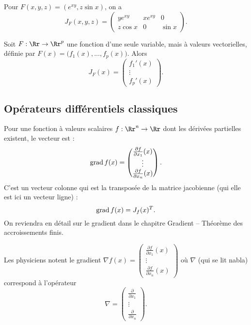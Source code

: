 \documentclass[11pt, class=report,crop=false]{standalone}
\begin{document}
\begin{exemple}
Pour $F(x,y,z)=(e^{xy},z\sin x)$, on a
$$J _F(x,y,z)=\begin{pmatrix}
y e^{xy}&x e^{xy}&0 \\ z\cos x &0&\sin x 
\end{pmatrix}.$$
\end{exemple}

\begin{exemple}
Soit $F : \Rr \to \Rr^p$ une fonction d'une seule variable, mais à valeurs vectorielles, définie par 
$F(x) = \big( f_1(x), \ldots,f_p(x) \big)$.
Alors 
$$J_F(x) =\begin{pmatrix}
f_1'(x) \\ \vdots \\ f_p'(x) 
\end{pmatrix}.$$ 
\end{exemple}


\subsection{Opérateurs différentiels classiques}
 

Pour une fonction à valeurs scalaires $f : \Rr^n \to \Rr$ 
dont les dérivées partielles existent, le vecteur  est :
$$\operatorname{grad} f (x) = \begin{pmatrix}
\frac{\partial f}{\partial x_1}(x)\\
\vdots \\
\frac{\partial f}{\partial x_n}(x)
\end{pmatrix}.$$
C'est un vecteur colonne qui est la transposée de la matrice jacobienne (qui elle est ici un vecteur ligne) : 
$$\operatorname{grad} f(x) = J_f (x)^T.$$
On reviendra en détail sur le gradient dans le chapitre \og{}Gradient -- Théorème des accroissements finis\fg{}.

Les physiciens notent le gradient $\nabla f (x) =
\begin{pmatrix} 
\frac{\partial f}{\partial x_1}(x)\\
\vdots \\ 
\frac{\partial f}{\partial x_n}(x)
\end{pmatrix}$
où $\nabla$ (qui se lit \og{}nabla\fg{}) correspond à l'opérateur
$$\nabla = \begin{pmatrix} 
\frac{\partial}{\partial x_1}\\
\vdots\\
\frac{\partial }{\partial x_n}\end{pmatrix}.
$$
\end{document}
